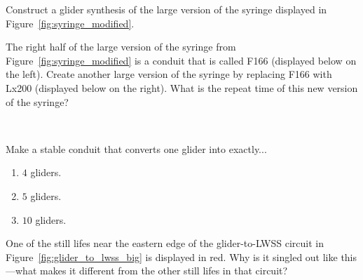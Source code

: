 \begin{multicols}{2}
	
	\mfilbreak
	
	
	\begin{problem}\label{exer:syringe_glider_synth}
		Construct a glider synthesis of the large version of the syringe displayed in Figure~\ref{fig:syringe_modified}.
	\end{problem}
	
	
	\mfilbreak
	
	
	\begin{problemstar}\label{exer:syringe_Lx200}
		The right half of the large version of the syringe from Figure~\ref{fig:syringe_modified} is a conduit that is called F166 (displayed below on the left). Create another large version of the syringe by replacing F166 with Lx200 (displayed below on the right). What is the repeat time of this new version of the syringe?
		
		\begin{center}
			~\quad~
		\end{center}
		
		
	\end{problemstar}
	
	
	\mfilbreak
	
	
	\begin{problem}\label{exer:convert_more_gliders}
		Make a stable conduit that converts one glider into exactly...\smallskip
		
		\begin{enumerate}[label=\bf\color{ocre}(\alph*)]
			\item $4$ gliders.
			
			\item $5$ gliders.
			
			\item $10$ gliders.
		\end{enumerate}
	\end{problem}
	
	
	\mfilbreak
	
	
	\begin{problem}\label{exer:glider_to_lwss_weird_sl}
		One of the still lifes near the eastern edge of the glider-to-LWSS circuit in Figure~\ref{fig:glider_to_lwss_big} is displayed in red. Why is it singled out like this---what makes it different from the other still lifes in that circuit?
	\end{problem}
	

\end{multicols}
